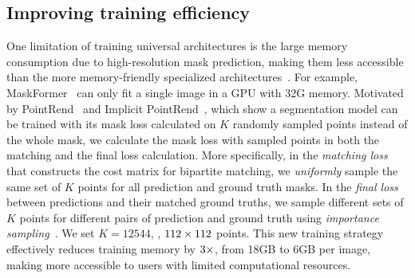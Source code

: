 \subsection{Improving training efficiency}
\label{sec:method:arch:loss}


One limitation of training universal architectures is the large memory consumption due to high-resolution mask prediction, making them less accessible than the more memory-friendly specialized architectures~\cite{he2017mask,chen2019hybrid}. For example, MaskFormer~\cite{cheng2021maskformer} can only fit a single image in a GPU with 32G memory. Motivated by PointRend~\cite{kirillov2020pointrend} and Implicit PointRend~\cite{cheng2021pointly}, which show a segmentation model can be trained with its mask loss calculated on $K$ randomly sampled points instead of the whole mask, we calculate the mask loss with sampled points in both the matching and the final loss calculation. More specifically, in the \emph{matching loss} that constructs the cost matrix for bipartite matching, we \emph{uniformly} sample the same set of $K$ points for all prediction and ground truth masks. In the \emph{final loss} between predictions and their matched ground truths, we sample different sets of $K$ points for different pairs of prediction and ground truth using \emph{importance sampling}~\cite{kirillov2020pointrend}. We set $K=12544$, \ie, $112 \times 112$ points. This new training strategy effectively reduces training memory by $3\times$, from 18GB to 6GB per image, making \modelname more accessible to users with limited computational resources.